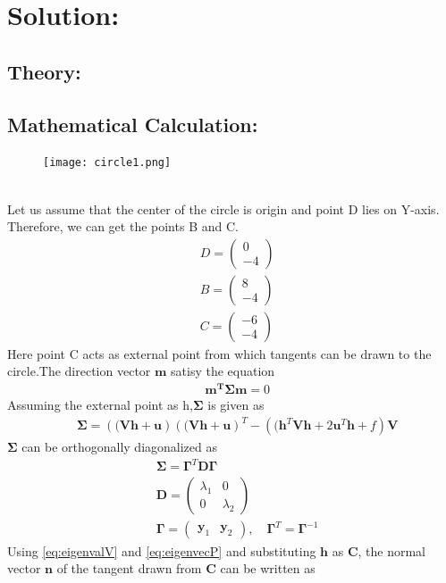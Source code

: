 \documentclass[a4paper,12pt,twocolumn]{article}
\let\vec\mathbf
\newcommand{\myvec}[1]{\ensuremath{\begin{pmatrix}#1\end{pmatrix}}}
\providecommand{\brak}[1]{\ensuremath{\left((#1\right)}}
\begin{document}
\section{Solution:}
\subsection{Theory:}
\subsection{Mathematical Calculation:}
\begin{figure}[h]
    \texttt{[image: circle1.png]}
\end{figure}
\\
\solution
Let us assume that the center of the circle is origin and point D lies on Y-axis.\\
Therefore, we can get the points B and C.\\
\begin{align*}
	&D = \myvec{0\\-4}\\
	&B = \myvec{8\\-4}\\
	&C = \myvec{-6\\-4}
\end{align*}
Here point C acts as external point from which tangents can be drawn to the circle.The direction vector $\vec{m}$ satisy the equation\\
\begin{align*}
	&\vec{m^T}\vec{\Sigma}\vec{m} = 0
\end{align*}
Assuming the external point as h,$\vec{\Sigma}$ is given as\\
\begin{align*}
	&\vec{\Sigma} = \brak{\vec{Vh}+\vec{u}}\brak{\vec{Vh}+\vec{u}}^T - \brak{\vec{h}^T\vec{V}\vec{h} + 2\vec{u}^T\vec{h} + f}\vec{V}
\end{align*}
$\vec{\Sigma}$ can be orthogonally  diagonalized as\\
\begin{align}
	&\vec{\Sigma} = \vec{\Gamma}^T\vec{D}\vec{\Gamma}\\
	\label{eq:eigenvalV}
	&\vec{D} = \myvec{\lambda_1 & 0\\0 & \lambda_2}\\
	\label{eq:eigenvecP}
	&\vec{\Gamma} = \myvec{\vec{y}_1 & \vec{y}_2}, \quad \vec{\Gamma}^T=\vec{\Gamma}^{-1}
\end{align}
Using \eqref{eq:eigenvalV} and \eqref{eq:eigenvecP} and substituting $\vec{h}$ as $\vec{C}$, the normal vector $\vec{n}$ of the tangent drawn from $\vec{C}$ can be written as\\
\end{document}
